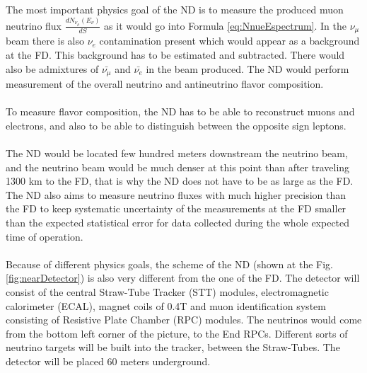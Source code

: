 The most important physics goal of the ND is to measure the produced muon neutrino flux $\frac{dN_{\nu_\mu}(E_{\nu})}{dS}$ as it would go into Formula \ref{eq:NnueEspectrum}. In the $\nu_\mu$ beam there is also $\nu_e$ contamination present which would appear as a background at the FD. This background has to be estimated and subtracted. There would also be admixtures of $\bar{\nu_\mu}$ and $\bar{\nu_e}$ in the beam produced. The ND would perform measurement of the overall neutrino and antineutrino flavor composition. \\ \\
To measure flavor composition, the ND has to be able to reconstruct muons and electrons, and also to be able to distinguish between the opposite sign leptons. \\ \\
The ND would be located few hundred meters downstream the neutrino beam, and the neutrino beam would be much denser at this point than after traveling 1300 km to the FD, that is why the ND does not have to be as large as the FD. The ND also aims to measure neutrino fluxes with much higher precision than the FD to keep systematic uncertainty of the measurements at the FD smaller than the expected statistical error for data collected during the whole expected time of operation.\\ \\  
Because of different physics goals, the scheme of the ND (shown at the Fig. \ref{fig:nearDetector}) is also very different from the one of the FD. The detector will consist of the central Straw-Tube Tracker (STT) modules, electromagnetic calorimeter (ECAL), magnet coils of 0.4T and muon identification system consisting of Resistive Plate Chamber (RPC) modules. The neutrinos would come from the bottom left corner of the picture, to the End RPCs. Different sorts of neutrino targets will be built into the tracker, between the Straw-Tubes. The detector will be placed 60 meters underground.\\ \\
